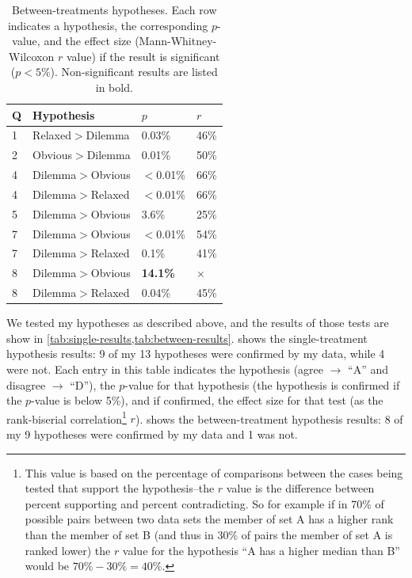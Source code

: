 \begin{table}[!hp]
\centering
\bgroup
\def\arraystretch{1.1}
\setlength{\tabcolsep}{0.7em}
\begin{tabular}{p{0.3em} | p{8em} | p{2.8em} | p{1.4em} |}
Q & Hypothesis & $p$ & $r$ \\
\hline
1  & Relaxed$>$Dilemma & 0.03\% & 46\% \\
\hline
2  & Obvious$>$Dilemma & 0.01\% & 50\% \\
\hline
4  & Dilemma$>$Obvious & $<$0.01\% & 66\% \\
\hline
4  & Dilemma$>$Relaxed & $<$0.01\% & 66\% \\
\hline
5  & Dilemma$>$Obvious & 3.6\% & 25\% \\
\hline
7  & Dilemma$>$Obvious & $<$0.01\% & 54\% \\
\hline
7  & Dilemma$>$Relaxed & 0.1\% & 41\% \\
\hline
8  & Dilemma$>$Obvious & \textbf{14.1\%} & $\times$ \\
\hline
8  & Dilemma$>$Relaxed & 0.04\% & 45\% \\
\hline
\end{tabular}
\egroup
  \caption{Between-treatments hypotheses. Each row indicates a hypothesis, the corresponding $p$-value, and the effect size (Mann-Whitney-Wilcoxon $r$ value) if the result is significant ($p < 5\%$). Non-significant results are listed in bold.}
  \label{tab:between-results}
\end{table}


We tested my hypotheses as described above, and the results of those tests are show in \cref{tab:single-results,tab:between-results}.
%
 shows the single-treatment hypothesis results: 9 of my 13 hypotheses were confirmed by my data, while 4 were not.
%
Each entry in this table indicates the hypothesis (agree $\rightarrow$ ``A'' and disagree $\rightarrow$ ``D''), the $p$-value for that hypothesis (the hypothesis is confirmed if the $p$-value is below 5\%), and if confirmed, the effect size for that test (as the rank-biserial correlation\footnote{This value is based on the percentage of comparisons between the cases being tested that support the hypothesis--the $r$ value is the difference between percent supporting and percent contradicting. So for example if in 70\% of possible pairs between two data sets the member of set A has a higher rank than the member of set B (and thus in 30\% of pairs the member of set A is ranked lower) the $r$ value for the hypothesis ``A has a higher median than B'' would be $70\% - 30\% = 40\%$.} $r$).
%
 shows the between-treatment hypothesis results: 8 of my 9 hypotheses were confirmed by my data and 1 was not.


